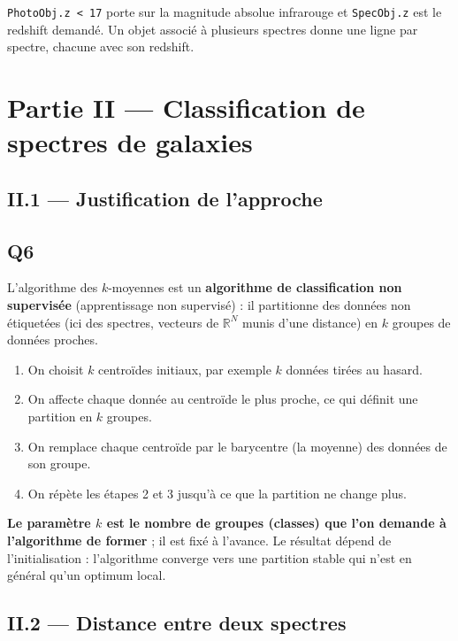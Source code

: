 \documentclass[11pt,a4paper]{article}
\providecommand{\tightlist}{\setlength{\itemsep}{0pt}\setlength{\parskip}{0pt}}
\begin{document}
\texttt{PhotoObj.z\ \textless{}\ 17} porte sur la magnitude absolue infrarouge et \texttt{SpecObj.z} est le redshift demandé. Un objet associé à plusieurs spectres donne une ligne par spectre, chacune avec son redshift.

\hypertarget{partie-ii-classification-de-spectres-de-galaxies}{%
\section{Partie II --- Classification de spectres de galaxies}\label{partie-ii-classification-de-spectres-de-galaxies}}

\hypertarget{ii.1-justification-de-lapproche}{%
\subsection{II.1 --- Justification de l'approche}\label{ii.1-justification-de-lapproche}}

\hypertarget{q6}{%
\subsection{Q6}\label{q6}}

L'algorithme des \(k\)-moyennes est un \textbf{algorithme de classification non supervisée} (apprentissage non supervisé) : il partitionne des données non étiquetées (ici des spectres, vecteurs de \({\mathbb{R}}^N\) munis d'une distance) en \(k\) groupes de données proches.

\begin{enumerate}
\def\labelenumi{\arabic{enumi}.}
\tightlist
\item
  On choisit \(k\) centroïdes initiaux, par exemple \(k\) données tirées au hasard.
\item
  On affecte chaque donnée au centroïde le plus proche, ce qui définit une partition en \(k\) groupes.
\item
  On remplace chaque centroïde par le barycentre (la moyenne) des données de son groupe.
\item
  On répète les étapes 2 et 3 jusqu'à ce que la partition ne change plus.
\end{enumerate}

\textbf{Le paramètre \(k\) est le nombre de groupes (classes) que l'on demande à l'algorithme de former} ; il est fixé à l'avance. Le résultat dépend de l'initialisation : l'algorithme converge vers une partition stable qui n'est en général qu'un optimum local.

\hypertarget{ii.2-distance-entre-deux-spectres}{%
\subsection{II.2 --- Distance entre deux spectres}\label{ii.2-distance-entre-deux-spectres}}
\end{document}
